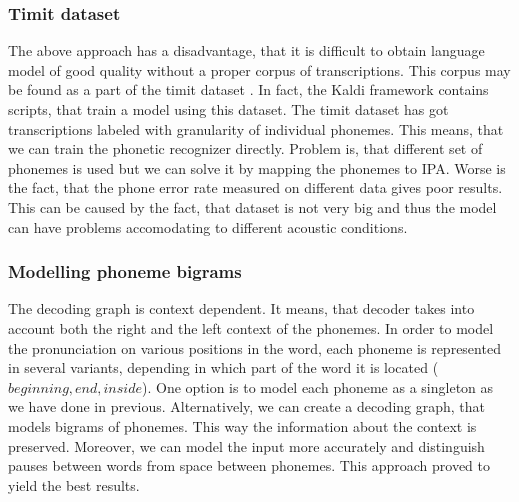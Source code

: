 \subsubsection{Timit dataset}
The above approach has a disadvantage, that it is difficult to obtain language model of good quality without a proper corpus of transcriptions.
This corpus may be found as a part of the timit dataset \cite{lopes2011phoneme}.
In fact, the Kaldi framework contains scripts, that train a model using this dataset.
The timit dataset has got transcriptions labeled with granularity of individual phonemes.
This means, that we can train the phonetic recognizer directly.
Problem is, that different set of phonemes is used but we can solve it by mapping the phonemes to IPA.
Worse is the fact, that the phone error rate measured on different data gives poor results.
This can be caused by the fact, that dataset is not very big and thus the model can have problems accomodating to different acoustic conditions.  
\subsubsection{Modelling phoneme bigrams}
The decoding graph is context dependent. 
It means, that decoder takes into account both the right and the left context of the phonemes. 
In order to model the pronunciation on various positions in the word, each phoneme is represented in several variants, depending in which part of the word it is located ($beginning, end, inside$). 
One option is to model each phoneme as a singleton as we have done in previous.
Alternatively, we can create a decoding graph, that models bigrams of phonemes.
This way the information about the context is preserved.
Moreover, we can model the input more accurately and distinguish pauses between words from space between phonemes. 
This approach proved to yield the best results.

